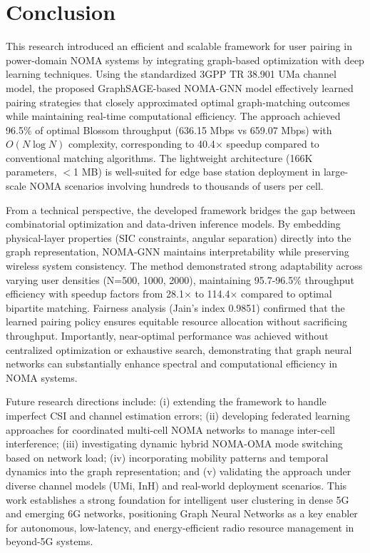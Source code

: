 \section{Conclusion}
This research introduced an efficient and scalable framework for user pairing in power-domain NOMA systems by integrating graph-based optimization with deep learning techniques. Using the standardized 3GPP TR 38.901 UMa channel model, the proposed GraphSAGE-based NOMA-GNN model effectively learned pairing strategies that closely approximated optimal graph-matching outcomes while maintaining real-time computational efficiency. The approach achieved 96.5\% of optimal Blossom throughput (636.15 Mbps vs 659.07 Mbps) with $O(N\log N)$ complexity, corresponding to 40.4$\times$ speedup compared to conventional matching algorithms. The lightweight architecture (166K parameters, $<$1 MB) is well-suited for edge base station deployment in large-scale NOMA scenarios involving hundreds to thousands of users per cell.

From a technical perspective, the developed framework bridges the gap between combinatorial optimization and data-driven inference models. By embedding physical-layer properties (SIC constraints, angular separation) directly into the graph representation, NOMA-GNN maintains interpretability while preserving wireless system consistency. The method demonstrated strong adaptability across varying user densities (N=500, 1000, 2000), maintaining 95.7-96.5\% throughput efficiency with speedup factors from 28.1$\times$ to 114.4$\times$ compared to optimal bipartite matching. Fairness analysis (Jain's index 0.9851) confirmed that the learned pairing policy ensures equitable resource allocation without sacrificing throughput. Importantly, near-optimal performance was achieved without centralized optimization or exhaustive search, demonstrating that graph neural networks can substantially enhance spectral and computational efficiency in NOMA systems.

Future research directions include: (i) extending the framework to handle imperfect CSI and channel estimation errors; (ii) developing federated learning approaches for coordinated multi-cell NOMA networks to manage inter-cell interference; (iii) investigating dynamic hybrid NOMA-OMA mode switching based on network load; (iv) incorporating mobility patterns and temporal dynamics into the graph representation; and (v) validating the approach under diverse channel models (UMi, InH) and real-world deployment scenarios. This work establishes a strong foundation for intelligent user clustering in dense 5G and emerging 6G networks, positioning Graph Neural Networks as a key enabler for autonomous, low-latency, and energy-efficient radio resource management in beyond-5G systems.

